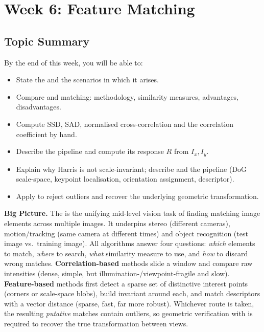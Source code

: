 \section{Week 6: Feature Matching}

\subsection{Topic Summary}

\begin{keybox}
By the end of this week, you will be able to:
\begin{itemize}
  \item State the  and the scenarios in which it arises.
  \item Compare  and  matching: methodology, similarity measures, advantages, disadvantages.
  \item Compute SSD, SAD, normalised cross-correlation and the correlation coefficient by hand.
  \item Describe the  pipeline and compute its response $R$ from $I_x, I_y$.
  \item Explain why Harris is not scale-invariant; describe  and the  pipeline (DoG scale-space, keypoint localisation, orientation assignment, descriptor).
  \item Apply  to reject outliers and recover the underlying geometric transformation.
\end{itemize}
\end{keybox}

\textbf{Big Picture.}
The  is the unifying mid-level vision task of finding matching image elements across multiple images. It underpins stereo (different cameras), motion/tracking (same camera at different times) and object recognition (test image vs.\ training image). All algorithms answer four questions: \emph{which} elements to match, \emph{where} to search, \emph{what} similarity measure to use, and \emph{how} to discard wrong matches. \textbf{Correlation-based} methods slide a window and compare raw intensities (dense, simple, but illumination-/viewpoint-fragile and slow). \textbf{Feature-based} methods first detect a sparse set of distinctive interest points (corners or scale-space blobs), build invariant  around each, and match descriptors with a vector distance (sparse, fast, far more robust). Whichever route is taken, the resulting \emph{putative} matches contain outliers, so geometric verification with  is required to recover the true transformation between views.

